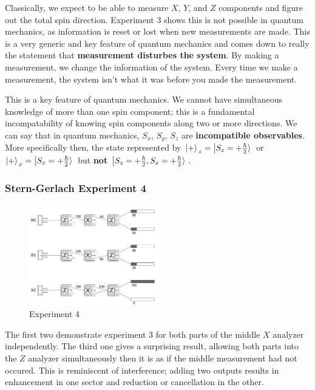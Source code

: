 \documentclass[english, 11pt]{article}
\begin{document}
         Classically, we expect to be able to measure $X$, $Y$, and $Z$ components and figure out the total spin direction.  Experiment 3 shows this is not possible in quantum mechanics, as information is reset or lost when new measurements are made. This is a very generic and key feature of quantum mechanics and comes down to really the statement that \textbf{measurement disturbes the system}. By making a measurement, we change the information of the system. Every time we make a measurement, the system isn't what it was before you made the measurement.
         \newline

         This is a key feature of quantum mechanics. We cannot have simultaneous knowledge of more than one spin component; this is a fundamental incompatability of knowing spin components along two or more directions. We can say that in quantum mechanics, $S_x$, $S_y$, $S_z$ are \textbf{incompatible observables}. More specifically then, the state represented by $\left| + \rangle \right._z = \left| S_z = +\frac{\hbar}{2} \rangle \right.$ or $\left| + \rangle \right._x = \left| S_x = + \frac{\hbar}{2} \rangle \right.$ but \textbf{not} $\left| S_z = +\frac{\hbar}{2}, S_x = + \frac{\hbar}{2} \rangle \right.$.

      \subsubsection{Stern-Gerlach Experiment 4}

         \begin{figure}[t!]
            \centering
            \includegraphics[width=0.5\textwidth]{stern_gerlach_exp4.png}
            \caption{Experiment 4}
         \end{figure}

         The first two demonstrate experiment 3 for both parts of the middle $X$ analyzer independently. The third one gives a surprising result, allowing both parts into the $Z$ analyzer simultaneously then it is as if the middle measurement had not occured. This is reminiscent of interference; adding two outputs results in enhancement in one sector and reduction or cancellation in the other.
         \newline
\end{document}
